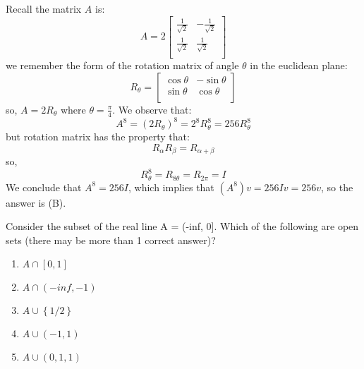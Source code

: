 \documentclass[12pt]{report}
\newcounter{it}
\theoremstyle{largebreak}
\begin{document}
    \begin{sol}
        Recall the matrix $A$ is:
        \begin{equation*}
            A=2\left[
                \begin{array}{cc}
                    \frac{1}{\sqrt{2}} & -\frac{1}{\sqrt{2}} \\
                    \frac{1}{\sqrt{2}} & \frac{1}{\sqrt{2}} \\
                \end{array}
            \right]
        \end{equation*}
        we remember the form of the rotation matrix of angle $\theta$ in the euclidean plane:
        \begin{equation*}
            R_\theta=\left[
                \begin{array}{cc}
                    \cos\theta & -\sin\theta \\
                    \sin\theta & \cos\theta \\
                \end{array}
            \right]
        \end{equation*}
        so, $A=2R_\theta$ where $\theta=\frac{\pi}{4}$. We observe that:
        \begin{equation*}
            A^8=(2R_\theta)^8=2^8 R_\theta^8=256R_\theta^8
        \end{equation*}
        but rotation matrix has the property that:
        \begin{equation*}
            R_\alpha R_\beta=R_{\alpha+\beta}
        \end{equation*}
        so,
        \begin{equation*}
            R_\theta^8=R_{ 8\theta}=R_{2\pi}=I
        \end{equation*}
        We conclude that $A^8=256 I$, which implies that $(A^8)v=256Iv=256 v$, so the answer is (B).
    \end{sol}

    \begin{excer}
        Consider the subset of the real line A = (-inf, 0]. Which of the following are open sets (there may be more than 1 correct answer)?
        \begin{enumerate}[label = \textit{(\Alph*)}]
            \item $ A \cap [0,1]$
            \item $A \cap (-inf,-1)$
            \item $A \cup \left\{1/2\right\}$
            \item $A \cup (-1,1)$
            \item $A \cup (0,1,1)$
        \end{enumerate}
    \end{excer}
\end{document}

